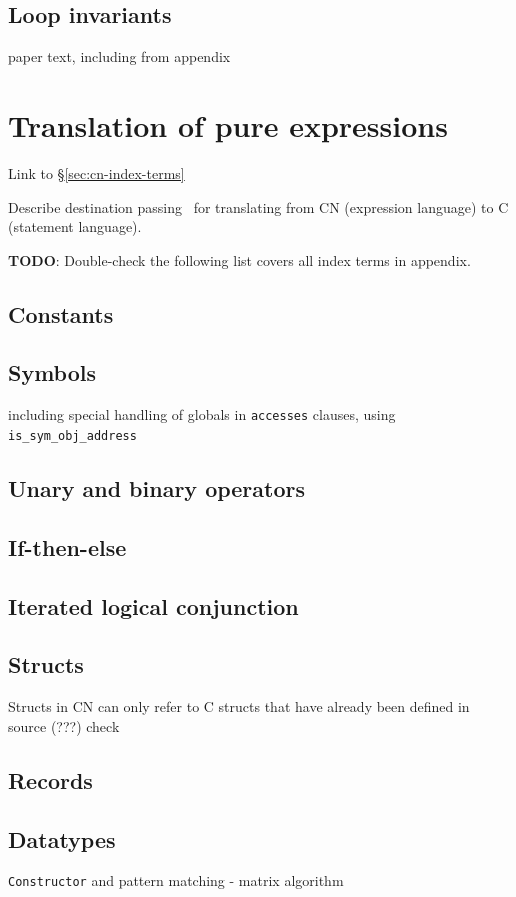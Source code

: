 \documentclass[withindex,glossary]{cam-thesis}
\begin{document}
\subsection{Loop invariants}
paper text, including from appendix


\section{Translation of pure expressions}

Link to \S\ref{sec:cn-index-terms}

Describe destination passing~\cite{destinationPassing} for translating from CN (expression language) to C (statement language).


\textbf{TODO}: Double-check the following list covers all index terms in appendix.

\subsection{Constants}
\subsection{Symbols} including special handling of globals in \texttt{accesses} clauses, using \texttt{is\_sym\_obj\_address}
\subsection{Unary and binary operators}
\subsection{If-then-else}
\subsection{Iterated logical conjunction}
\subsection{Structs}
Structs in CN can only refer to C structs that have already been defined in source (???) check
\subsection{Records}
\subsection{Datatypes}
\texttt{Constructor} and pattern matching - matrix algorithm~\cite{matrixAlgorithm}
\end{document}
